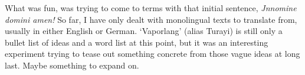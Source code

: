 \documentclass[12pt,paper=a4]{scrartcl}
\newcommand{\fw}[1]{\textit{#1}} %
\begin{document}
What was fun, was trying to come to terms with that initial sentence, 
\fw{Jnn\emph{omin}e d\emph{omi}n\emph{i} am\emph{en}!} So far, I have only dealt 
with monolingual texts to translate from, usually in either English or German. 
\enquote*{Vaporlang} (alias Turayi) is still only a bullet list of ideas and a 
word list at this point, but it was an interesting experiment trying to tease 
out something concrete from those vague ideas at long last. Maybe something to 
expand on.


\pagebreak

\begin{multicols}{3}
\printglossary[style=mysuper,type=\leipzigtype]
\end{multicols}

\printbibliography[heading=bibintoc]
\end{document}

